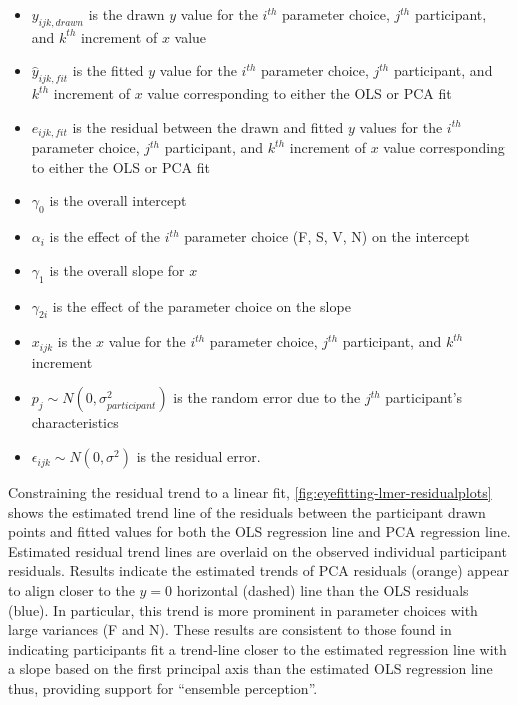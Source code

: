 \documentclass[12pt]{article}
\providecommand{\tightlist}{%
  \setlength{\itemsep}{0pt}\setlength{\parskip}{0pt}}
\begin{document}
\begin{itemize}
\tightlist
\item
  \(y_{ijk,drawn}\) is the drawn \(y\) value for the \(i^{th}\)
  parameter choice, \(j^{th}\) participant, and \(k^{th}\) increment of
  \(x\) value
\item
  \(\hat y_{ijk,fit}\) is the fitted \(y\) value for the \(i^{th}\)
  parameter choice, \(j^{th}\) participant, and \(k^{th}\) increment of
  \(x\) value corresponding to either the OLS or PCA fit
\item
  \(e_{ijk,fit}\) is the residual between the drawn and fitted \(y\)
  values for the \(i^{th}\) parameter choice, \(j^{th}\) participant,
  and \(k^{th}\) increment of \(x\) value corresponding to either the
  OLS or PCA fit
\item
  \(\gamma_0\) is the overall intercept
\item
  \(\alpha_i\) is the effect of the \(i^{th}\) parameter choice (F, S,
  V, N) on the intercept
\item
  \(\gamma_1\) is the overall slope for \(x\)
\item
  \(\gamma_{2i}\) is the effect of the parameter choice on the slope
\item
  \(x_{ijk}\) is the \(x\) value for the \(i^{th}\) parameter choice,
  \(j^{th}\) participant, and \(k^{th}\) increment
\item
  \(p_{j} \sim N(0, \sigma^2_{participant})\) is the random error due to
  the \(j^{th}\) participant's characteristics
\item
  \(\epsilon_{ijk} \sim N(0, \sigma^2)\) is the residual error.
\end{itemize}

Constraining the residual trend to a linear fit,
\cref{fig:eyefitting-lmer-residualplots} shows the estimated trend line
of the residuals between the participant drawn points and fitted values
for both the OLS regression line and PCA regression line. Estimated
residual trend lines are overlaid on the observed individual participant
residuals. Results indicate the estimated trends of PCA residuals
(orange) appear to align closer to the \(y=0\) horizontal (dashed) line
than the OLS residuals (blue). In particular, this trend is more
prominent in parameter choices with large variances (F and N). These
results are consistent to those found in \citet{mosteller1981eye}
indicating participants fit a trend-line closer to the estimated
regression line with a slope based on the first principal axis than the
estimated OLS regression line thus, providing support for ``ensemble
perception''.
\end{document}
